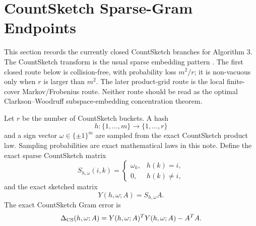 \documentclass[11pt]{article}
\theoremstyle{remark}
\begin{document}
\section*{CountSketch Sparse-Gram Endpoints}

This section records the currently closed CountSketch branches for Algorithm
3.  The CountSketch transform is the usual sparse embedding pattern
\cite{CharikarChenFarachColton2002,ClarksonWoodruff2013}.  The first closed
route below is collision-free, with probability loss \(m^2/r\); it is
non-vacuous only when \(r\) is larger than \(m^2\).  The later product-grid
route is the local finite-cover Markov/Frobenius route.  Neither route should
be read as the optimal Clarkson--Woodruff subspace-embedding concentration
theorem.

Let \(r\) be the number of CountSketch buckets.  A hash
\[
  h:\{1,\ldots,m\}\to\{1,\ldots,r\}
\]
and a sign vector \(\omega\in\{\pm1\}^m\) are sampled from the exact
CountSketch product law.  Sampling probabilities are exact mathematical laws
in this note.  Define the exact sparse CountSketch matrix
\[
  S_{h,\omega}(i,k)=
  \begin{cases}
    \omega_k,& h(k)=i,\\
    0,& h(k)\ne i,
  \end{cases}
\]
and the exact sketched matrix
\[
  Y(h,\omega;A)=S_{h,\omega}A .
\]
The exact CountSketch Gram error is
\[
  \Delta_{\rm CS}(h,\omega;A)
  =
  Y(h,\omega;A)^TY(h,\omega;A)-A^TA .
\]
\end{document}
